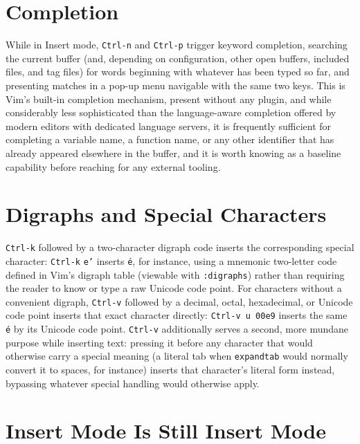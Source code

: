 \section{Completion}

While in Insert mode, \texttt{Ctrl-n} and \texttt{Ctrl-p} trigger keyword completion, searching the current buffer (and, depending on configuration, other open buffers, included files, and tag files) for words beginning with whatever has been typed so far, and presenting matches in a pop-up menu navigable with the same two keys. This is Vim's built-in completion mechanism, present without any plugin, and while considerably less sophisticated than the language-aware completion offered by modern editors with dedicated language servers, it is frequently sufficient for completing a variable name, a function name, or any other identifier that has already appeared elsewhere in the buffer, and it is worth knowing as a baseline capability before reaching for any external tooling.

\section{Digraphs and Special Characters}

\texttt{Ctrl-k} followed by a two-character digraph code inserts the corresponding special character: \texttt{Ctrl-k} \texttt{e'} inserts \texttt{\'{e}}, for instance, using a mnemonic two-letter code defined in Vim's digraph table (viewable with \texttt{:digraphs}) rather than requiring the reader to know or type a raw Unicode code point. For characters without a convenient digraph, \texttt{Ctrl-v} followed by a decimal, octal, hexadecimal, or Unicode code point inserts that exact character directly: \texttt{Ctrl-v u 00e9} inserts the same \texttt{\'{e}} by its Unicode code point. \texttt{Ctrl-v} additionally serves a second, more mundane purpose while inserting text: pressing it before any character that would otherwise carry a special meaning (a literal tab when \texttt{expandtab} would normally convert it to spaces, for instance) inserts that character's literal form instead, bypassing whatever special handling would otherwise apply.

\section{Insert Mode Is Still Insert Mode}

